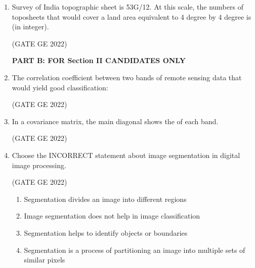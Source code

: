 \documentclass[journal,12pt,onecolumn]{IEEEtran}
\theoremstyle{remark}
\begin{document}
\begin{enumerate}
\item Survey of India topographic sheet is 53G/12. At this scale, the numbers of toposheets that would cover a land area equivalent to 4 degree by 4 degree is \makebox[1cm]{\hrulefill} (in integer).

\hfill (GATE GE 2022)

\textbf{PART B: FOR Section II CANDIDATES ONLY }

\item The correlation coefficient between two bands of remote sensing data that would yield good classification:

\hfill (GATE GE 2022)

\begin{enumerate}
\end{enumerate}

\item In a covariance matrix, the main diagonal shows the \makebox[1cm]{\hrulefill} of each band.

\hfill (GATE GE 2022)

\begin{enumerate}
\end{enumerate}

\item Choose the INCORRECT statement about image segmentation in digital image processing.

\hfill (GATE GE 2022)

\begin{enumerate}
    \item Segmentation divides an image into different regions
    \item Image segmentation does not help in image classification
    \item Segmentation helps to identify objects or boundaries
    \item Segmentation is a process of partitioning an image into multiple sets of similar pixels
\end{enumerate}


\end{enumerate}
\end{document}
